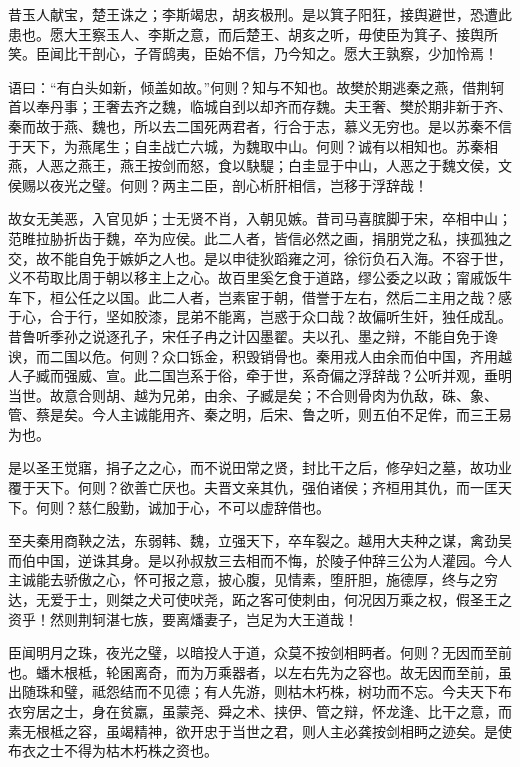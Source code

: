 \documentclass[12pt,UTF8]{ctexbook}
\begin{document}
昔玉人献宝，楚王诛之；李斯竭忠，胡亥极刑。是以箕子阳狂，接舆避世，恐遭此患也。愿大王察玉人、李斯之意，而后楚王、胡亥之听，毋使臣为箕子、接舆所笑。臣闻比干剖心，子胥鸱夷，臣始不信，乃今知之。愿大王孰察，少加怜焉！



语曰：“有白头如新，倾盖如故。”何则？知与不知也。故樊於期逃秦之燕，借荆轲首以奉丹事；王奢去齐之魏，临城自刭以却齐而存魏。夫王奢、樊於期非新于齐、秦而故于燕、魏也，所以去二国死两君者，行合于志，慕义无穷也。是以苏秦不信于天下，为燕尾生；自圭战亡六城，为魏取中山。何则？诚有以相知也。苏秦相燕，人恶之燕王，燕王按剑而怒，食以駃騠；白圭显于中山，人恶之于魏文侯，文侯赐以夜光之璧。何则？两主二臣，剖心析肝相信，岂移于浮辞哉！



故女无美恶，入官见妒；士无贤不肖，入朝见嫉。昔司马喜膑脚于宋，卒相中山；范睢拉胁折齿于魏，卒为应侯。此二人者，皆信必然之画，捐朋党之私，挟孤独之交，故不能自免于嫉妒之人也。是以申徒狄蹈雍之河，徐衍负石入海。不容于世，义不苟取比周于朝以移主上之心。故百里奚乞食于道路，缪公委之以政；甯戚饭牛车下，桓公任之以国。此二人者，岂素宦于朝，借誉于左右，然后二主用之哉？感于心，合于行，坚如胶漆，昆弟不能离，岂惑于众口哉？故偏听生奸，独任成乱。昔鲁听季孙之说逐孔子，宋任子冉之计囚墨翟。夫以孔、墨之辩，不能自免于谗谀，而二国以危。何则？众口铄金，积毁销骨也。秦用戎人由余而伯中国，齐用越人子臧而强威、宣。此二国岂系于俗，牵于世，系奇偏之浮辞哉？公听并观，垂明当世。故意合则胡、越为兄弟，由余、子臧是矣；不合则骨肉为仇敌，硃、象、管、蔡是矣。今人主诚能用齐、秦之明，后宋、鲁之听，则五伯不足侔，而三王易为也。



是以圣王觉寤，捐子之之心，而不说田常之贤，封比干之后，修孕妇之墓，故功业覆于天下。何则？欲善亡厌也。夫晋文亲其仇，强伯诸侯；齐桓用其仇，而一匡天下。何则？慈仁殷勤，诚加于心，不可以虚辞借也。



至夫秦用商鞅之法，东弱韩、魏，立强天下，卒车裂之。越用大夫种之谋，禽劲吴而伯中国，逆诛其身。是以孙叔敖三去相而不悔，於陵子仲辞三公为人灌园。今人主诚能去骄傲之心，怀可报之意，披心腹，见情素，堕肝胆，施德厚，终与之穷达，无爱于士，则桀之犬可使吠尧，跖之客可使刺由，何况因万乘之权，假圣王之资乎！然则荆轲湛七族，要离燔妻子，岂足为大王道哉！



臣闻明月之珠，夜光之璧，以暗投人于道，众莫不按剑相眄者。何则？无因而至前也。蟠木根柢，轮囷离奇，而为万乘器者，以左右先为之容也。故无因而至前，虽出随珠和璧，祗怨结而不见德；有人先游，则枯木朽株，树功而不忘。今夫天下布衣穷居之士，身在贫羸，虽蒙尧、舜之术、挟伊、管之辩，怀龙逢、比干之意，而素无根柢之容，虽竭精神，欲开忠于当世之君，则人主必龚按剑相眄之迹矣。是使布衣之士不得为枯木朽株之资也。
\end{document}
